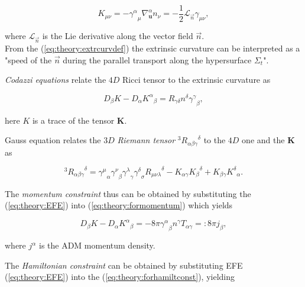 {    \begin{equation}
    K_{\mu\nu} = -{\gamma^{\alpha}}_{\mu}\nabla_{\boldsymbol{u}}^{\alpha} n_{\nu} = -\frac{1}{2}\mathcal{L}_{\vec{n}}\gamma_{\mu\nu},
    \label{eq:theory:extrcurvdef}
    \end{equation}
    
    where $\mathcal{L}_{\vec{n}}$ is the Lie derivative along the vector field $\vec{n}$. \\
    From the (\ref{eq:theory:extrcurvdef}) the extrinsic curvature can be interpreted as a "speed of the $\vec{n}$ during the parallel transport along the hypersurface $\Sigma_t$".
    
    \textit{Codazzi equations} relate the $4D$ Ricci tensor to the extrinsic curvature as
    
    \begin{equation}
    D_{\beta}K-D_{\alpha}{K^{\alpha}}_{\beta}=R_{\gamma\delta}n^{\delta}{\gamma^{\gamma}}_{\beta},
    \label{eq:theory:formomentum}
    \end{equation}
    
    here $K$ is a trace of the tensor $\boldsymbol{K}$.
    
    Gauss equation relates the $3D$ \textit{Riemann tensor} $^3{R_{\alpha\beta\gamma}}^{\delta}$ to the $4D$ one and the $\boldsymbol{K}$ as 
    
    \begin{equation}
    ^3{R_{\alpha\beta\gamma}}^{\delta} = {\gamma^{\mu}}_{\alpha}{\gamma^{\nu}}_{\beta}{\gamma^{\lambda}}_{\gamma}{\gamma^{\delta}}_{\sigma}{R_{\mu\nu\lambda}}^{\delta}-K_{\alpha\gamma}{K_{\beta}}^{\delta}+K_{\beta\gamma}{K^{\delta}}_{\alpha}.
    \label{eq:theory:forhamiltconst}
    \end{equation}
    
    The \textit{momentum constraint} thus can be obtained by substituting the (\ref{eq:theory:EFE}) into  (\ref{eq:theory:formomentum}) which yields
    
    \begin{equation}
    D_{\beta}K-D_{\alpha}{K^{\alpha}}_{\beta} = -8\pi{\gamma^{\alpha}}_{\beta} n^{\gamma}T_{\alpha\gamma}=:8\pi j_{\beta},
    \label{eq:theory:momconstraint}
    \end{equation}
    
    where $j^{\alpha}$ is the ADM momentum density.
    
    The \textit{Hamiltonian constraint} can be obtained by substituting EFE (\ref{eq:theory:EFE}) into the (\ref{eq:theory:forhamiltconst}), yielding 
    
}
